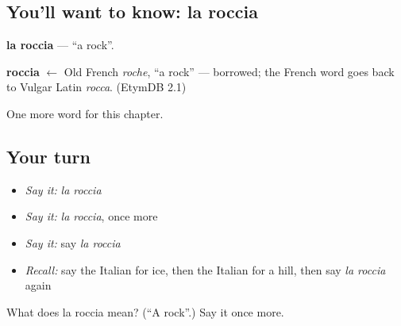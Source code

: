 \subsection*{You'll want to know: la roccia}
\textbf{la roccia} — \textquotedblleft{}a rock\textquotedblright{}.

\begin{cousinweb}
\textbf{roccia} $\leftarrow$ Old French \emph{roche}, \textquotedblleft{}a rock\textquotedblright{} — borrowed; the French word goes back to Vulgar Latin \emph{rocca}. (EtymDB 2.1)
\end{cousinweb}

\begin{grammarlens}[title={What you've built}]
One more word for this chapter.
\end{grammarlens}

\subsection*{Your turn}
\begin{itemize}
\raggedright
  \item \emph{Say it:} \emph{la roccia}
  \item \emph{Say it:} \emph{la roccia}, once more
  \item \emph{Say it:} say \emph{la roccia}
  \item \emph{Recall:} say the Italian for ice, then the Italian for a hill, then say \emph{la roccia} again
\end{itemize}

\begin{tcolorbox}[breakable,colback=teal!4,colframe=teal!35!black,title={Before you move on}]
What does la roccia mean? (\textquotedblleft{}A rock\textquotedblright{}.) Say it once more.
\end{tcolorbox}
